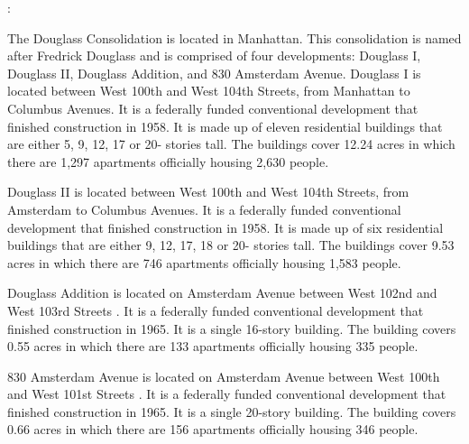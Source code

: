 :    

  

The Douglass Consolidation is located in Manhattan. This consolidation is named after Fredrick Douglass and is comprised of four developments: Douglass I, Douglass II, Douglass Addition, and 830 Amsterdam Avenue. Douglass I is located between West 100th and West 104th Streets, from Manhattan to Columbus Avenues. It is a federally funded conventional development that finished construction in 1958. It is made up of eleven residential buildings that are either 5, 9, 12, 17 or 20- stories tall. The buildings cover 12.24 acres in which there are 1,297 apartments officially housing 2,630 people.     

Douglass II is located between West 100th and West 104th Streets, from Amsterdam to Columbus Avenues. It is a federally funded conventional development that finished construction in 1958. It is made up of six residential buildings that are either 9, 12, 17, 18 or 20- stories tall. The buildings cover 9.53 acres in which there are 746 apartments officially housing 1,583 people.     

    

Douglass Addition is located on Amsterdam Avenue between West 102nd and West 103rd Streets . It is a federally funded conventional development that finished construction in 1965. It is a single 16-story building. The building covers 0.55 acres in which there are 133 apartments officially housing 335 people.     

 

830 Amsterdam Avenue is located on Amsterdam Avenue between West 100th and West 101st Streets . It is a federally funded conventional development that finished construction in 1965. It is a single 20-story building. The building covers 0.66 acres in which there are 156 apartments officially housing 346 people.     

      

 